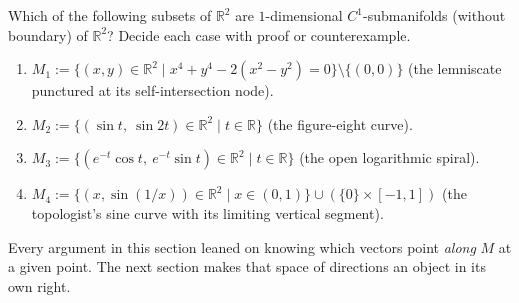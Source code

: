 \begin{exercise}
\label{ex:identifying_one_submanifolds_in_plane}
Which of the following subsets of $\mathbb{R}^2$ are $1$-dimensional $C^1$-submanifolds (without boundary) of $\mathbb{R}^2$? Decide each case with proof or counterexample.
\begin{enumerate}[label=\textbf{(\alph*)}]
  \item $M_1 := \big\{(x,y) \in \mathbb{R}^2 \;\big|\; x^4 + y^4 - 2(x^2 - y^2) = 0\big\} \setminus \{(0,0)\}$ (the lemniscate punctured at its self-intersection node).
  \item $M_2 := \big\{(\sin t,\ \sin 2t) \in \mathbb{R}^2 \;\big|\; t \in \mathbb{R}\big\}$ (the figure-eight curve).
  \item $M_3 := \big\{(e^{-t}\cos t,\ e^{-t}\sin t) \in \mathbb{R}^2 \;\big|\; t \in \mathbb{R}\big\}$ (the open logarithmic spiral).
  \item $M_4 := \big\{(x, \sin(1/x)) \in \mathbb{R}^2 \;\big|\; x \in (0, 1)\big\} \cup (\{0\} \times [-1, 1])$ (the topologist's sine curve with its limiting vertical segment).
\end{enumerate}
\end{exercise}

Every argument in this section leaned on knowing which vectors point \emph{along} $M$ at a given
point. The next section makes that space of directions an object in its own right.
